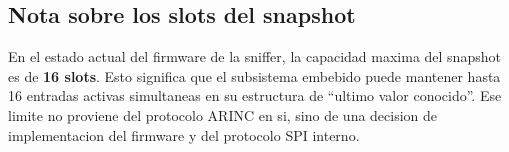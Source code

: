 \documentclass[12pt,a4paper]{article}
\begin{document}
\subsection*{Nota sobre los slots del snapshot}

En el estado actual del firmware de la sniffer, la capacidad maxima del snapshot es de \textbf{16 slots}. Esto significa que el subsistema embebido puede mantener hasta 16 entradas activas simultaneas en su estructura de ``ultimo valor conocido''. Ese limite no proviene del protocolo ARINC en si, sino de una decision de implementacion del firmware y del protocolo SPI interno.
\end{document}
